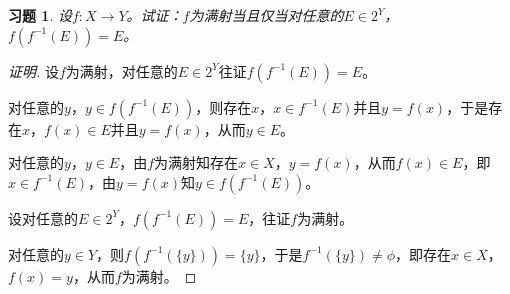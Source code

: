 \documentclass{article}
\begin{document}
\begin{CJK}{UTF8}{gbsn}
\newtheorem*{Ex}{习题}
\begin{Ex}
设$f:X\to Y$。试证：$f$为满射当且仅当对任意的$E\in 2^Y$，$f(f^{-1}(E))=E$。
\end{Ex}
\begin{proof}[证明]
  设$f$为满射，对任意的$E\in 2^Y$往证$f(f^{-1}(E))=E$。

  对任意的$y$，$y\in f(f^{-1}(E))$，则存在$x$，$x\in f^{-1}(E)$并且$y=f(x)$，于是存在$x$，$f(x) \in E$并且$y=f(x)$，从而$y\in E$。

  对任意的$y$，$y\in E$，由$f$为满射知存在$x\in X$，$y=f(x)$，从而$f(x)\in E$，即$x\in f^{-1}(E)$，由$y=f(x)$知$y\in f(f^{-1}(E))$。

  设对任意的$E\in 2^Y$，$f(f^{-1}(E))=E$，往证$f$为满射。

  对任意的$y\in Y$，则$f(f^{-1}(\{y\}))=\{y\}$，于是$f^{-1}(\{y\})\neq \phi$，即存在$x\in X$，$f(x)=y$，从而$f$为满射。
\end{proof}
\end{CJK}
\end{document}
